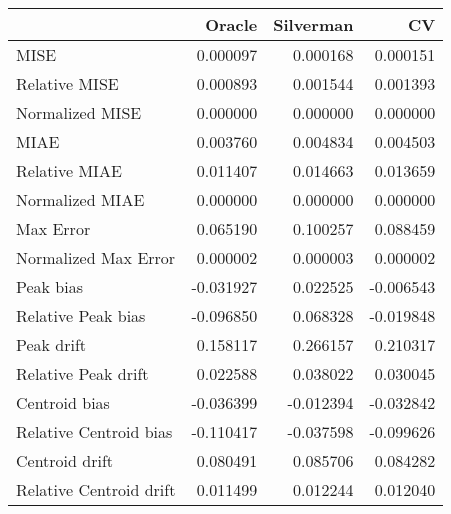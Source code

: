 \begin{tabular}{lrrr}
  \hline
 & Oracle & Silverman & CV \\ 
  \hline
MISE & 0.000097 & 0.000168 & 0.000151 \\ 
  Relative MISE & 0.000893 & 0.001544 & 0.001393 \\ 
  Normalized MISE & 0.000000 & 0.000000 & 0.000000 \\ 
  MIAE & 0.003760 & 0.004834 & 0.004503 \\ 
  Relative MIAE & 0.011407 & 0.014663 & 0.013659 \\ 
  Normalized MIAE & 0.000000 & 0.000000 & 0.000000 \\ 
  Max Error & 0.065190 & 0.100257 & 0.088459 \\ 
  Normalized Max Error & 0.000002 & 0.000003 & 0.000002 \\ 
  Peak bias & -0.031927 & 0.022525 & -0.006543 \\ 
  Relative Peak bias & -0.096850 & 0.068328 & -0.019848 \\ 
  Peak drift & 0.158117 & 0.266157 & 0.210317 \\ 
  Relative Peak drift & 0.022588 & 0.038022 & 0.030045 \\ 
  Centroid bias & -0.036399 & -0.012394 & -0.032842 \\ 
  Relative Centroid bias & -0.110417 & -0.037598 & -0.099626 \\ 
  Centroid drift & 0.080491 & 0.085706 & 0.084282 \\ 
  Relative Centroid drift & 0.011499 & 0.012244 & 0.012040 \\ 
   \hline
\end{tabular}
